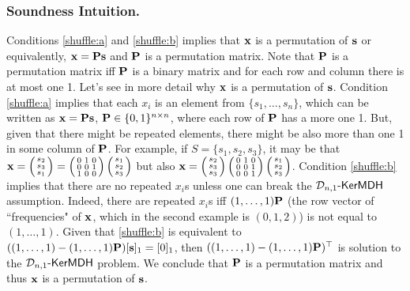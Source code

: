 \subsubsection{Soundness Intuition.} Conditions \ref{shuffle:a} and \ref{shuffle:b} implies that $\mathbf{x}$ is a permutation of $\mathbf{s}$ or equivalently, $\mathbf{{x}}=\mathbf{{P}}\mathbf{s}$ and $\mathbf{{P}}$ is a permutation matrix. Note that $\mathbf{{P}}$ is a permutation matrix iff $\mathbf{{P}}$ is a binary matrix and for each row and column there is at most one 1. Let's see in more detail why $\mathbf{x}$ is a permutation of $\mathbf{s}$. Condition \ref{shuffle:a} implies that each $x_i$ is an element from $\{s_1,\ldots,s_n\}$, which can be written as $\mathbf{x}=\mathbf{{P}}\mathbf{s}$, $\mathbf{{P}}\in\{0,1\}^{n\times n}$, where each row of $\mathbf{{P}}$ has a more one 1. But, given that there might be repeated elements, there might be also more than one 1 in some column of $\mathbf{{P}}$. For example, if $S=\{s_1,s_2,s_3\}$, it may be that $\mathbf{x}=\left(\begin{smallmatrix}s_2\\s_3\\s_1\end{smallmatrix}\right)=\left(\begin{smallmatrix}0&1&0\\0&0&1\\1&0&0\end{smallmatrix}\right)\left(\begin{smallmatrix}s_1\\s_2\\s_3\end{smallmatrix}\right)$ but also $\mathbf{x}=\left(\begin{smallmatrix}s_2\\s_3\\s_3\end{smallmatrix}\right)\left(\begin{smallmatrix}0&1&0\\0&0&1\\0&0&1\end{smallmatrix}\right)\left(\begin{smallmatrix}s_1\\s_2\\s_3\end{smallmatrix}\right)$. Condition \ref{shuffle:b} implies that there are no repeated $x_i$s unless one can break the $\mathcal{D}_{n,1}\mbox{-}\mathsf{KerMDH}$ assumption. Indeed, there are repeated $x_i$s iff  $(1,\ldots,1)\mathbf{{P}}$ (the row vector of ``frequencies" of $\mathbf{x}$, which in the second example is $(0,1,2)$) is not equal to $ (1,\ldots,1)$. Given that \ref{shuffle:b} is equivalent to $((1,\ldots,1)-(1,\ldots,1)\mathbf{{P}})[\mathbf{s}]_1=[0]_1$, then $((1,\ldots,1)-(1,\ldots,1)\mathbf{{P}})^\top$ is solution to the $\mathcal{D}_{n,1}\mbox{-}\mathsf{KerMDH}$ problem. We conclude that $\mathbf{{P}}$ is a permutation matrix and thus $\mathbf{x}$ is a permutation of $\mathbf{s}$.

